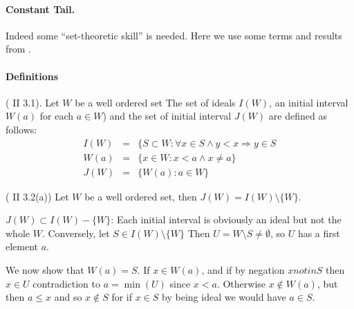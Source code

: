 \begin{enumerate}
\paragraph{Constant Tail.}
Indeed some ``set-theoretic skill'' is needed.
Here we use some terms and results from \cite{Dug1966}.
\paragraph{Definitions} (\cite{Dug1966} \textsf{II 3.1}).
Let $W$ be a well ordered set
The set of ideals \(I(W)\),
an initial interval \(W(a)\) for each \(a\in W\))
and the set of initial interval \(J(W)\)
are defined as follows:
\begin{eqnarray*}
I(W) &=& \{S\subset W: \forall x\in S\wedge y < x \Rightarrow y\in S \\
W(a) &=& \{x\in W: x < a \wedge x\neq a\}  \\
J(W) &=& \{W(a): a\in W\}
\end{eqnarray*}

\begin{llem} \label{llem:set:ideals}
\textnormal{(\cite{Dug1966} \textsf{II 3.2(a)})}
Let $W$ be a well ordered set, then \(J(W) = I(W) \setminus \{W\}\).
\end{llem}
\begin{thmproof}
\(J(W) \subset I(W) - \{W\}\): Each initial interval is obviously an ideal
but not the whole $W$.
Conversely, let \(S\in I(W) \setminus \{W\}\) Then
\(U = W\setminus S\neq \emptyset\), so $U$ has a first element $a$.

We now show that \(W(a)=S\).
If \(x\in W(a)\), and if by negation \(x notin S\) then \(x\in U\)
contradiction to \(a=\min(U)\) since \(x<a\).
Otherwise \(x\notin W(a)\), but then \(a\leq x\) and so \(x\notin S\)
for if \(x\in S\) by being ideal we would have \(a\in S\).
\end{thmproof}


\end{enumerate}
